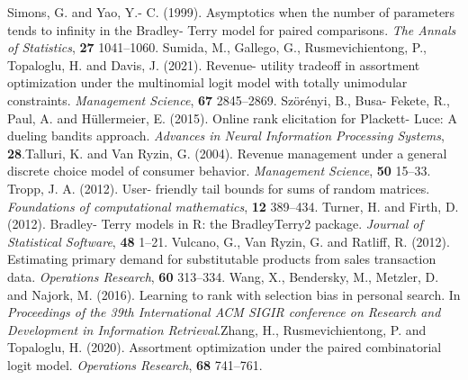 Simons, G. and Yao, Y.- C. (1999). Asymptotics when the number of
parameters tends to infinity in the Bradley- Terry model for paired
comparisons. \emph{The Annals of Statistics}, \textbf{27} 1041--1060.
Sumida, M., Gallego, G., Rusmevichientong, P., Topaloglu, H. and Davis,
J. (2021). Revenue- utility tradeoff in assortment optimization under
the multinomial logit model with totally unimodular constraints.
\emph{Management Science}, \textbf{67} 2845--2869. Szörényi, B., Busa-
Fekete, R., Paul, A. and Hüllermeier, E. (2015). Online rank elicitation
for Plackett- Luce: A dueling bandits approach. \emph{Advances in Neural
Information Processing Systems}, \textbf{28}.Talluri, K. and Van Ryzin,
G. (2004). Revenue management under a general discrete choice model of
consumer behavior. \emph{Management Science}, \textbf{50} 15--33. Tropp,
J. A. (2012). User- friendly tail bounds for sums of random matrices.
\emph{Foundations of computational mathematics}, \textbf{12} 389--434.
Turner, H. and Firth, D. (2012). Bradley- Terry models in R: the
BradleyTerry2 package. \emph{Journal of Statistical Software},
\textbf{48} 1--21. Vulcano, G., Van Ryzin, G. and Ratliff, R. (2012).
Estimating primary demand for substitutable products from sales
transaction data. \emph{Operations Research}, \textbf{60} 313--334.
Wang, X., Bendersky, M., Metzler, D. and Najork, M. (2016). Learning to
rank with selection bias in personal search. In \emph{Proceedings of the
39th International ACM SIGIR conference on Research and Development in
Information Retrieval}.Zhang, H., Rusmevichientong, P. and Topaloglu, H.
(2020). Assortment optimization under the paired combinatorial logit
model. \emph{Operations Research}, \textbf{68} 741--761.




